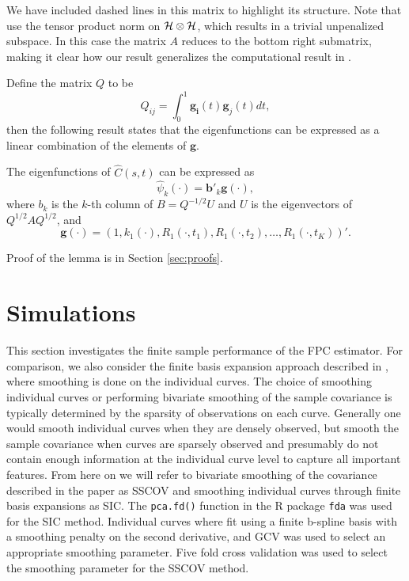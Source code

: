 We have included dashed lines in this matrix to highlight its structure. Note that \cite{Cai:2010vr} use the tensor product norm on $\mathcal{H}\otimes \mathcal{H}$, which results in a trivial unpenalized subspace. In this case the matrix $A$ reduces to the bottom right submatrix, making it clear how our result generalizes the computational result in \cite{Cai:2010vr}.

Define the matrix $Q$ to be 
\begin{equation*}
	Q_{ij} = \int_0^1\mathbf{g_i}(t)\mathbf{g}_j(t)dt, 
\end{equation*}
then the following result states that the eigenfunctions can be expressed as a linear combination of the elements of $\mathbf{g}$. 
\begin{lemma}
	\label{thm:eigenfunctions} The eigenfunctions of $\hat{C}(s,t)$ can be expressed as 
	\begin{equation*}
		\hat{\psi}_k(\cdot) = \mathbf{b}'_k\mathbf{g}(\cdot), 
	\end{equation*}
	where $b_k$ is the $k$-th column of $B=Q^{-1/2}U$ and $U$ is the eigenvectors of $Q^{1/2}AQ^{1/2}$, and
	\[ \mathbf{g(\cdot)}=(1, k_1(\cdot),R_{1}(\cdot, t_1),R_{1}(\cdot, t_2),\dots, R_{1}(\cdot, t_K))'. \]
\end{lemma}
Proof of the lemma is in Section \ref{sec:proofs}.
\section{Simulations} 

\label{sec:simulations}

This section investigates the finite sample performance of the FPC estimator. For comparison, we also consider the finite basis expansion approach described in \cite{FDA}, where smoothing is done on the individual curves. The choice of smoothing individual curves or performing bivariate smoothing of the sample covariance is typically determined by the sparsity of observations on each curve. Generally one would smooth individual curves when they are densely observed, but smooth the sample covariance when curves are sparsely observed and presumably do not contain enough information at the individual curve level to capture all important features. From here on we will refer to bivariate smoothing of the covariance described in the paper as SSCOV and smoothing individual curves through finite basis expansions as SIC. The \texttt{pca.fd()} function in the R package \texttt{fda} was used for the SIC method. Individual curves where fit using a finite b-spline basis with a smoothing penalty on the second derivative, and GCV was used to select an appropriate smoothing parameter. Five fold cross validation was used to select the smoothing parameter for the SSCOV method. 

